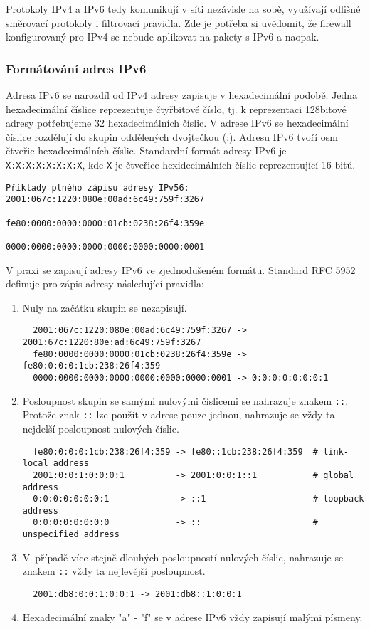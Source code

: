 Protokoly IPv4 a IPv6 tedy komunikují v síti nezávisle na sobě, využívají odlišné směrovací protokoly i filtrovací pravidla. Zde je potřeba si uvědomit, že firewall konfigurovaný pro IPv4 se nebude aplikovat na pakety s IPv6 a naopak. 

\subsubsection{Formátování adres IPv6}
Adresa IPv6 se narozdíl od IPv4 adresy zapisuje v hexadecimální podobě. Jedna hexadecimální číslice reprezentuje čtyřbitové číslo, tj. k reprezentaci 128bitové adresy potřebujeme 32 hexadecimálních číslic. V adrese IPv6 se hexadecimální číslice rozdělují do skupin oddělených dvojtečkou (:). Adresu IPv6 tvoří osm čtveřic hexadecimálních číslic. Standardní formát adresy IPv6 je {\tt X:X:X:X:X:X:X:X}, kde {\tt X} je čtveřice hexidecimálních číslic reprezentující 16 bitů. 
\begin{verbatim}
Příklady plného zápisu adresy IPv56: 2001:067c:1220:080e:00ad:6c49:759f:3267
                                     fe80:0000:0000:0000:01cb:0238:26f4:359e
                                     0000:0000:0000:0000:0000:0000:0000:0001
\end{verbatim}
V praxi se zapisují adresy IPv6 ve zjednodušeném formátu. Standard RFC 5952 \cite{rfc5952} definuje pro zápis adresy následující pravidla:
\begin{enumerate}
  \item Nuly na začátku skupin se nezapisují. 
\begin{verbatim}
  2001:067c:1220:080e:00ad:6c49:759f:3267 -> 2001:67c:1220:80e:ad:6c49:759f:3267
  fe80:0000:0000:0000:01cb:0238:26f4:359e -> fe80:0:0:0:1cb:238:26f4:359
  0000:0000:0000:0000:0000:0000:0000:0001 -> 0:0:0:0:0:0:0:1
\end{verbatim}
\item Posloupnost skupin se samými nulovými číslicemi se nahrazuje znakem {\tt ::}. Protože znak {\tt ::} lze použít v adrese pouze jednou, nahrazuje se vždy ta nejdelší posloupnost nulových číslic.  
\begin{verbatim}
  fe80:0:0:0:1cb:238:26f4:359 -> fe80::1cb:238:26f4:359  # link-local address
  2001:0:0:1:0:0:0:1          -> 2001:0:0:1::1           # global address
  0:0:0:0:0:0:0:1             -> ::1                     # loopback address   
  0:0:0:0:0:0:0:0             -> ::                      # unspecified address 
\end{verbatim}
  \item V~případě více stejně dlouhých posloupností nulových číslic, nahrazuje se znakem {\tt ::} vždy ta nejlevější posloupnost.
\begin{verbatim}
  2001:db8:0:0:1:0:0:1 -> 2001:db8::1:0:0:1
\end{verbatim}
    \item Hexadecimální znaky "a" - "f" se v adrese IPv6 vždy zapisují malými písmeny.
\end{enumerate}

